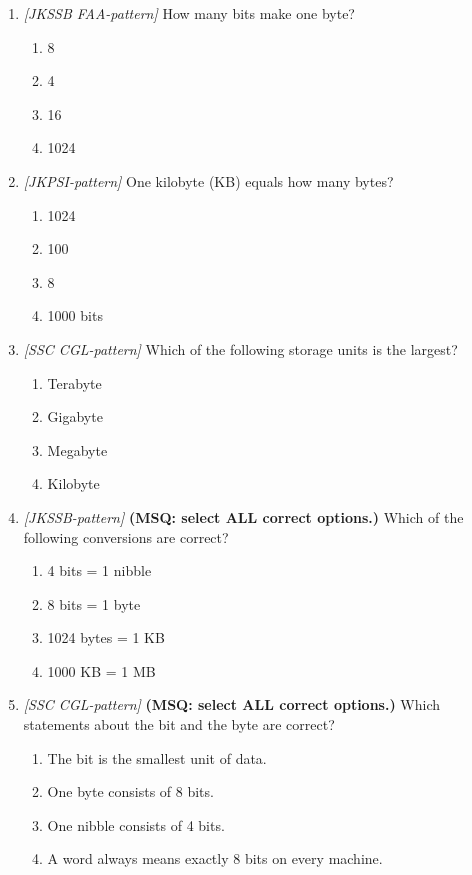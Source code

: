 \documentclass[11pt]{article}
\begin{document}
\begin{enumerate}[label=\textbf{Q\arabic*.}, leftmargin=*]
\item \textit{[JKSSB FAA-pattern]} How many bits make one byte?
  \begin{enumerate}[label=\Alph*.]
    \item 8
    \item 4
    \item 16
    \item 1024
  \end{enumerate}
\item \textit{[JKPSI-pattern]} One kilobyte (KB) equals how many bytes?
  \begin{enumerate}[label=\Alph*.]
    \item 1024
    \item 100
    \item 8
    \item 1000 bits
  \end{enumerate}
\item \textit{[SSC CGL-pattern]} Which of the following storage units is the largest?
  \begin{enumerate}[label=\Alph*.]
    \item Terabyte
    \item Gigabyte
    \item Megabyte
    \item Kilobyte
  \end{enumerate}
\item \textit{[JKSSB-pattern]} \textbf{(MSQ: select ALL correct options.)} Which of the following conversions are correct?
  \begin{enumerate}[label=\Alph*.]
    \item 4 bits = 1 nibble
    \item 8 bits = 1 byte
    \item 1024 bytes = 1 KB
    \item 1000 KB = 1 MB
  \end{enumerate}
\item \textit{[SSC CGL-pattern]} \textbf{(MSQ: select ALL correct options.)} Which statements about the bit and the byte are correct?
  \begin{enumerate}[label=\Alph*.]
    \item The bit is the smallest unit of data.
    \item One byte consists of 8 bits.
    \item One nibble consists of 4 bits.
    \item A word always means exactly 8 bits on every machine.
  \end{enumerate}
\end{enumerate}
\def\JKSSBLessonID{3}\def\JKSSBAnswers{0}
\end{document}
